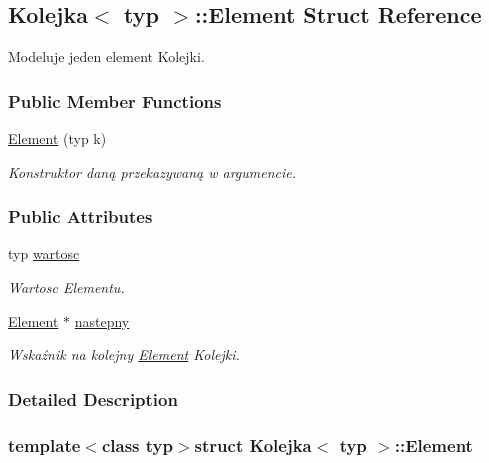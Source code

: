 \hypertarget{struct_kolejka_1_1_element}{\subsection{Kolejka$<$ typ $>$\-:\-:Element Struct Reference}
\label{struct_kolejka_1_1_element}
}


Modeluje jeden element Kolejki.  


\subsubsection*{Public Member Functions}
\begin{DoxyCompactItemize}
\item 
\hyperlink{struct_kolejka_1_1_element_a534aa24f7a971e4120615d0c15e30332}{Element} (typ k)
\begin{DoxyCompactList}\small\item\em Konstruktor daną przekazywaną w argumencie. \end{DoxyCompactList}\end{DoxyCompactItemize}
\subsubsection*{Public Attributes}
\begin{DoxyCompactItemize}
\item 
typ \hyperlink{struct_kolejka_1_1_element_a7d1b953f68cab0595bc8135004e0e976}{wartosc}
\begin{DoxyCompactList}\small\item\em Wartosc Elementu. \end{DoxyCompactList}\item 
\hyperlink{struct_kolejka_1_1_element}{Element} $\ast$ \hyperlink{struct_kolejka_1_1_element_aa67307ddfcb550be1fcc72bc91c6b4b9}{nastepny}
\begin{DoxyCompactList}\small\item\em Wskaźnik na kolejny \hyperlink{struct_kolejka_1_1_element}{Element} Kolejki. \end{DoxyCompactList}\end{DoxyCompactItemize}


\subsubsection{Detailed Description}
\subsubsection*{template$<$class typ$>$struct Kolejka$<$ typ $>$\-::\-Element}

